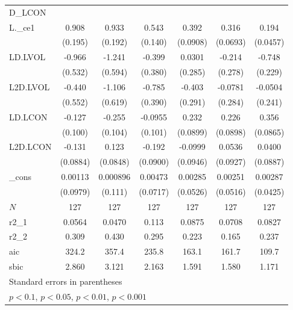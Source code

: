 {\begin{tabular}{l*{6}{c}}
\hline
D\_LCON    &                  &                  &                  &                  &                  &                  \\
L.\_ce1    &    0.908\sym{***}&    0.933\sym{***}&    0.543\sym{***}&    0.392\sym{***}&    0.316\sym{***}&    0.194\sym{***}\\
          &  (0.195)         &  (0.192)         &  (0.140)         & (0.0908)         & (0.0693)         & (0.0457)         \\
LD.LVOL   &   -0.966\sym{+}  &   -1.241\sym{*}  &   -0.399         &   0.0301         &   -0.214         &   -0.748\sym{**} \\
          &  (0.532)         &  (0.594)         &  (0.380)         &  (0.285)         &  (0.278)         &  (0.229)         \\
L2D.LVOL  &   -0.440         &   -1.106\sym{+}  &   -0.785\sym{*}  &   -0.403         &  -0.0781         &  -0.0504         \\
          &  (0.552)         &  (0.619)         &  (0.390)         &  (0.291)         &  (0.284)         &  (0.241)         \\
LD.LCON   &   -0.127         &   -0.255\sym{*}  &  -0.0955         &    0.232\sym{**} &    0.226\sym{*}  &    0.356\sym{***}\\
          &  (0.100)         &  (0.104)         &  (0.101)         & (0.0899)         & (0.0898)         & (0.0865)         \\
L2D.LCON  &   -0.131         &    0.123         &   -0.192\sym{*}  &  -0.0999         &   0.0536         &   0.0400         \\
          & (0.0884)         & (0.0848)         & (0.0900)         & (0.0946)         & (0.0927)         & (0.0887)         \\
\_cons    &  0.00113         & 0.000896         &  0.00473         &  0.00285         &  0.00251         &  0.00287         \\
          & (0.0979)         &  (0.111)         & (0.0717)         & (0.0526)         & (0.0516)         & (0.0425)         \\
\hline
\(N\)     &      127         &      127         &      127         &      127         &      127         &      127         \\
r2\_1      &   0.0564         &   0.0470         &    0.113         &   0.0875         &   0.0708         &   0.0827         \\
r2\_2      &    0.309         &    0.430         &    0.295         &    0.223         &    0.165         &    0.237         \\
aic       &    324.2         &    357.4         &    235.8         &    163.1         &    161.7         &    109.7         \\
sbic      &    2.860         &    3.121         &    2.163         &    1.591         &    1.580         &    1.171         \\
\hline\hline
\multicolumn{7}{l}{\footnotesize Standard errors in parentheses}\\
\multicolumn{7}{l}{\footnotesize \sym{+} \(p<0.1\), \sym{*} \(p<0.05\), \sym{**} \(p<0.01\), \sym{***} \(p<0.001\)}\\
\end{tabular}
}
